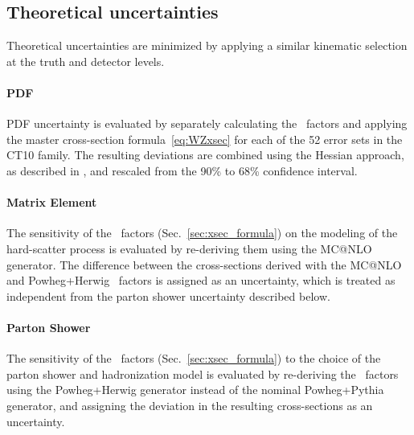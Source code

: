 \subsection{Theoretical uncertainties}
\label{sec:sys:theoryunc}
Theoretical uncertainties are minimized by applying a similar kinematic selection at the truth and detector levels.

\paragraph{PDF}
PDF uncertainty is evaluated by separately calculating the \C\ factors and applying the master cross-section formula~\ref{eq:WZxsec} for each of the 52 error sets in the CT10 family. The resulting deviations are combined using the Hessian approach, as described in \cite{Lai:2010nw}, and rescaled from the 90\% to 68\% confidence interval.

\paragraph{Matrix Element}
The sensitivity of the \C\ factors (Sec.~\ref{sec:xsec_formula}) on the modeling of the hard-scatter process is evaluated by re-deriving them using the MC@NLO generator. The difference between the cross-sections derived with the MC@NLO and Powheg+Herwig \C\ factors is assigned as an uncertainty, which is treated as independent from the parton shower uncertainty described below.

\paragraph{Parton Shower}
The sensitivity of the \C\ factors (Sec.~\ref{sec:xsec_formula}) to the choice of the parton shower and hadronization model is evaluated by re-deriving the \C\ factors using the Powheg+Herwig generator instead of the nominal Powheg+Pythia generator, and assigning the deviation in the resulting cross-sections as an uncertainty.

